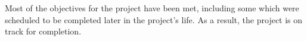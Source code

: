 \documentclass[a4paper]{article}
\begin{document}
Most of the objectives for the project have been met, including some which were scheduled to be completed later in the project's life. As a result, the project is on track for completion.





\end{document}
